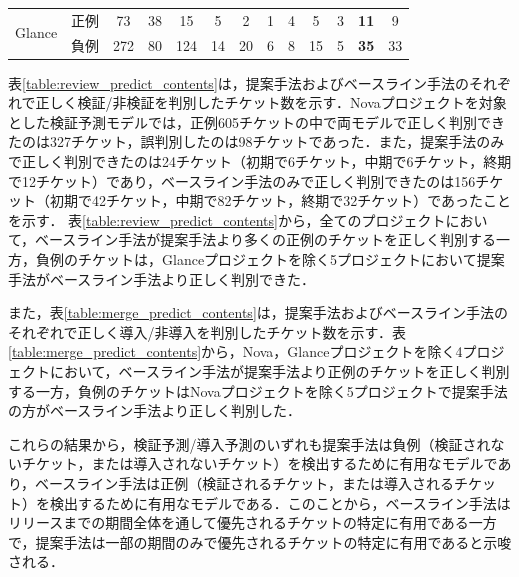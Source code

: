 \documentclass[T,J]{fose} %
\begin{document}
\begin{table}[]
{\begin{tabular}{l|l|c|c|c|cc|cc|cc|cc}
\multirow{2}{*}{Glance}                     & 正例                                         & 73                                        & 38                                          & 15                                           & 5         & 2          & 1         & 4          & 5         & 3          & {\textbf{11}}         & 9         \\
                                            & 負例                                         & 272                                       & 80                                          & 124                                          & 14        & 20         & 6         & 8          & 15        & 5          & {\textbf{35}}         & 33   \\  \hline    
\end{tabular}}
\end{table}

表\ref{table:review_predict_contents}は，提案手法およびベースライン手法のそれぞれで正しく検証/非検証を判別したチケット数を示す．Novaプロジェクトを対象とした検証予測モデルでは，正例605チケットの中で両モデルで正しく判別できたのは327チケット，誤判別したのは98チケットであった．また，提案手法のみで正しく判別できたのは24チケット（初期で6チケット，中期で6チケット，終期で12チケット）であり，ベースライン手法のみで正しく判別できたのは156チケット（初期で42チケット，中期で82チケット，終期で32チケット）であったことを示す．
表\ref{table:review_predict_contents}から，全てのプロジェクトにおいて，ベースライン手法が提案手法より多くの正例のチケットを正しく判別する一方，負例のチケットは，Glanceプロジェクトを除く5プロジェクトにおいて提案手法がベースライン手法より正しく判別できた．

また，表\ref{table:merge_predict_contents}は，提案手法およびベースライン手法のそれぞれで正しく導入/非導入を判別したチケット数を示す．表\ref{table:merge_predict_contents}から，Nova，Glanceプロジェクトを除く4プロジェクトにおいて，ベースライン手法が提案手法より正例のチケットを正しく判別する一方，負例のチケットはNovaプロジェクトを除く5プロジェクトで提案手法の方がベースライン手法より正しく判別した．

これらの結果から，検証予測/導入予測のいずれも提案手法は負例（検証されないチケット，または導入されないチケット）を検出するために有用なモデルであり，ベースライン手法は正例（検証されるチケット，または導入されるチケット）を検出するために有用なモデルである．このことから，ベースライン手法はリリースまでの期間全体を通して優先されるチケットの特定に有用である一方で，提案手法は一部の期間のみで優先されるチケットの特定に有用であると示唆される．
\end{document}
